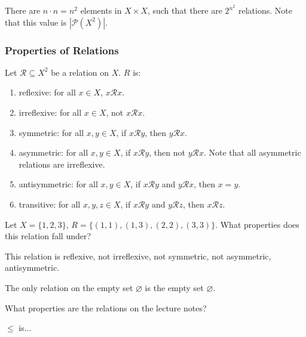 \documentclass[a4paper]{article}
\begin{document}
There are \( n \cdot n = n^2\) elements in \( X \times X \), such that there are \( 2^{n^2} \) relations. Note that this value is \( |\mathcal{P}(X^2)| \).

\subsubsection{Properties of Relations}

\begin{property}
	Let \( \mathcal{R} \subseteq X^2 \) be a relation on \( X \). \( R \) is:
	\begin{enumerate}
		\item reflexive: for all \( x \in X \), \( x \mathcal{R}x \).
		\item irreflexive: for all \( x \in X \), not \( x \mathcal{R}x \).
		\item symmetric: for all \( x,y \in X \), if \( x\mathcal{R}y \), then \(y\mathcal{R}x \).
		\item asymmetric: for all \( x,y \in X \), if \( x \mathcal{R}y \), then not \( y\mathcal{R}x \). Note that all asymmetric relations are irreflexive.
		\item antisymmetric: for all \( x,y \in X \), if \( x \mathcal{R}y \) and \( y\mathcal{R}x \), then \( x=y \).
		\item transitive: for all \( x,y,z \in X \), if \( x \mathcal{R}y \) and \( y\mathcal{R}z \), then \( x\mathcal{R}z \).
	\end{enumerate}
\end{property}

\begin{eg}
	Let \( X=\{1,2,3\}   \), \( R=\{(1,1),(1,3),(2,2),(3,3)\}   \). What properties does this relation fall under?
\end{eg}

This relation is reflexive, not irreflexive, not symmetric, not asymmetric, antisymmetric.

\begin{note}
	The only relation on the empty set \( \varnothing \) is the empty set \( \varnothing \).
\end{note}

What properties are the relations on the lecture notes?


\begin{eg}
	\( \le  \) is...
\end{eg}
\end{document}
